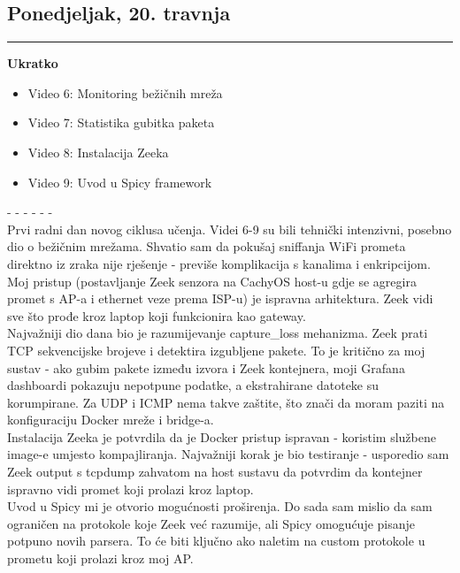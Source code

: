 \documentclass[12pt, a4paper]{article}
\newcommand{\dan}[1]{
    \subsection*{#1}
    \vspace{-0.5em} 
    \hrule \vspace{0.5em} 
}
\begin{document}
\dan{Ponedjeljak, 20. travnja}
\textbf{Ukratko}
\begin{itemize}
    \item Video 6: Monitoring bežičnih mreža
    \item Video 7: Statistika gubitka paketa
    \item Video 8: Instalacija Zeeka
    \item Video 9: Uvod u Spicy framework
\end{itemize}
- - - - - - \\
Prvi radni dan novog ciklusa učenja. Videi 6-9 su bili tehnički intenzivni, posebno dio o bežičnim mrežama. Shvatio sam da pokušaj 
sniffanja WiFi prometa direktno iz zraka nije rješenje - previše komplikacija s kanalima i enkripcijom. Moj pristup (postavljanje Zeek
 senzora na CachyOS host-u gdje se agregira promet s AP-a i ethernet veze prema ISP-u) je ispravna arhitektura. Zeek vidi sve što 
 prođe kroz laptop koji funkcionira kao gateway.
\\
Najvažniji dio dana bio je razumijevanje capture\_loss mehanizma. Zeek prati TCP sekvencijske brojeve i detektira izgubljene pakete. 
To je kritično za moj sustav - ako gubim pakete između izvora i Zeek kontejnera, moji Grafana dashboardi pokazuju nepotpune podatke, a 
ekstrahirane datoteke su korumpirane. Za UDP i ICMP nema takve zaštite, što znači da moram paziti na konfiguraciju Docker mreže i 
bridge-a.
\\
Instalacija Zeeka je potvrdila da je Docker pristup ispravan - koristim službene image-e umjesto kompajliranja. Najvažniji korak je 
bio testiranje - usporedio sam Zeek output s tcpdump zahvatom na host sustavu da potvrdim da kontejner ispravno vidi promet koji 
prolazi kroz laptop.
\\
Uvod u Spicy mi je otvorio mogućnosti proširenja. Do sada sam mislio da sam ograničen na protokole koje Zeek već razumije, ali Spicy 
omogućuje pisanje potpuno novih parsera. To će biti ključno ako naletim na custom protokole u prometu koji prolazi kroz moj AP.
\end{document}
